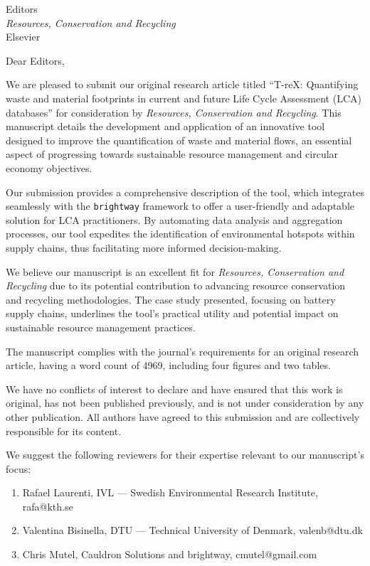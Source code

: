 \documentclass[10pt]{letter}
\begin{document}
\thispagestyle{empty}
\begin{letter}{Editors\\\textit{Resources, Conservation and Recycling}\\Elsevier}

    \opening{Dear Editors,}

    We are pleased to submit our original research article titled ``T-reX: Quantifying waste and material footprints in current and future Life Cycle Assessment (LCA) databases'' for consideration by \textit{Resources, Conservation and Recycling}. This manuscript details the development and application of an innovative tool designed to improve the quantification of waste and material flows, an essential aspect of progressing towards sustainable resource management and circular economy objectives.

    Our submission provides a comprehensive description of the tool, which integrates seamlessly with the \texttt{brightway} framework to offer a user-friendly and adaptable solution for LCA practitioners. By automating data analysis and aggregation processes, our tool expedites the identification of environmental hotspots within supply chains, thus facilitating more informed decision-making.

    We believe our manuscript is an excellent fit for \textit{Resources, Conservation and Recycling} due to its potential contribution to advancing resource conservation and recycling methodologies. The case study presented, focusing on battery supply chains, underlines the tool's practical utility and potential impact on sustainable resource management practices.

    The manuscript complies with the journal's requirements for an original research article, having a word count of 4969, including four figures and two tables.

    We have no conflicts of interest to declare and have ensured that this work is original, has not been published previously, and is not under consideration by any other publication. All authors have agreed to this submission and are collectively responsible for its content.

    \vspace{1em}

    We suggest the following reviewers for their expertise relevant to our manuscript's focus:

    \begin{enumerate}
        \item {Rafael Laurenti, IVL --- Swedish Environmental Research Institute, rafa@kth.se}
        \item {Valentina Bisinella,  DTU --- Technical University of Denmark, valenb@dtu.dk}
        \item {Chris Mutel, Cauldron Solutions and brightway, cmutel@gmail.com}
    \end{enumerate}
    \vspace{1em}


\end{letter}
\end{document}
